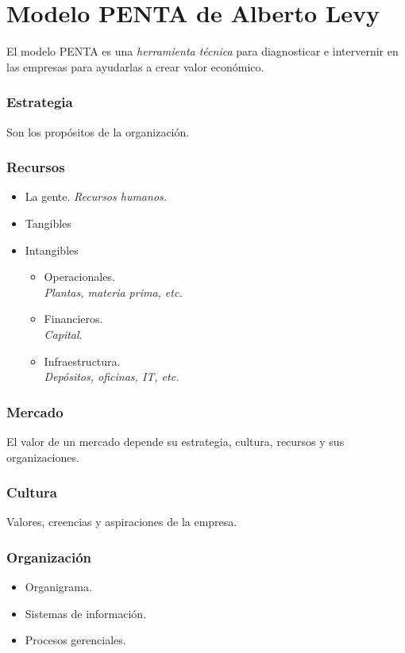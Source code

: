 \documentclass[9pt, spanish, a5paper]{article}
\begin{document}
\part{Modelo PENTA de Alberto Levy}

El modelo PENTA es una \emph{herramienta técnica} para diagnosticar e intervernir en las empresas para ayudarlas a crear valor económico.

\section{Estrategia}
Son los propósitos de la organización.

\section{Recursos}

\begin{itemize}
	\item La gente. \textit{Recursos humanos.}
	\item Tangibles
	\item Intangibles
		\begin{itemize}
			\item Operacionales.\\
			\textit{Plantas, materia prima, etc.}
			\item Financieros.\\
			\textit{Capital}.
			\item Infraestructura. \\
			\textit{Depósitos, oficinas, IT, etc.}
		\end{itemize}
\end{itemize}

\section{Mercado}

El valor de un mercado depende su estrategia, cultura, recursos y sus organizaciones.

\section{Cultura}
Valores, creencias y aspiraciones de la empresa.

\section{Organización}
\begin{itemize}
	\item Organigrama.
	\item Sistemas de información.
	\item Procesos gerenciales.
\end{itemize}
\end{document}
